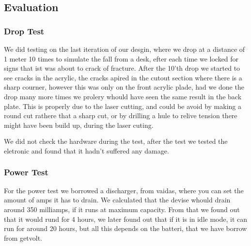 \subsection{Evaluation}
\subsubsection{Drop Test}
We did testing on the last iteration of our desgin, where we drop at a distance of 1 meter 10 times to simulate the fall from a desk, efter each time we locked for signs that ist was about to crack of fracture.
After the 10'th drop we started to see cracks in the acrylic, the cracks apired in the cutout section where there is a sharp courner, however this was only on the front acrylic plade, had we done the drop many more times we prolery whould have seen the same result in the back plate. 
This is properly due to the laser cutting, and could be avoid by making a round cut rathere that a sharp cut, or by drilling a hule to relive tension there might have been build up, during the laser cuting.

We did not check the hardware during the test, after the test we tested the eletronic and found that it hadn't suffered any damage.

\subsubsection{Power Test}
For the power test we borrowed a discharger, from vaidas, where you can set the amount of amps it has to drain.
We calculated that the devise whould drain around 350 milliamps, if it runs at maximum capacity.
From that we found out that it would rund for 4 hours, we later found out that if it is in idle mode, it can run for around 20 hours, but all this depends on the batteri, that we have borrow from getvolt.
